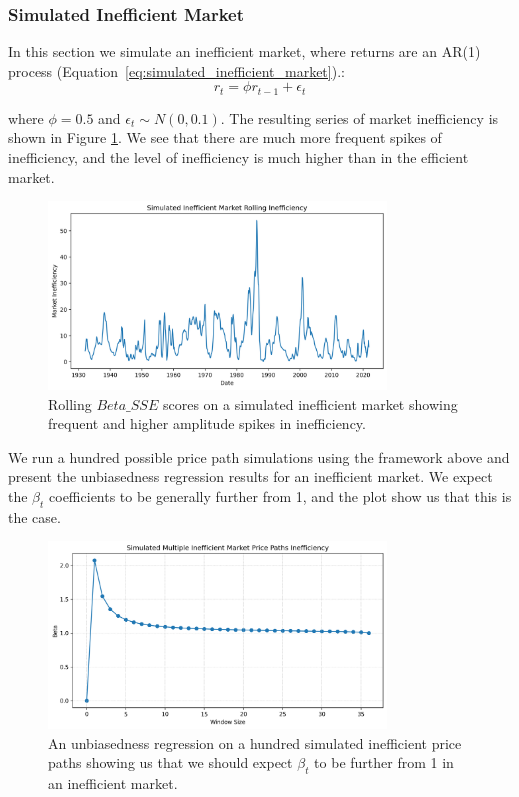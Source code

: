 \subsubsection{Simulated Inefficient Market}
In this section we simulate an inefficient market, where returns are an AR(1) process (Equation~\ref{eq:simulated_inefficient_market}).:
\begin{equation}
    r_t = \phi r_{t-1} + \epsilon_t
    \label{eq:simulated_inefficient_market}
\end{equation}

where $\phi = 0.5$ and $\epsilon_t \sim N(0, 0.1)$. The resulting series of market inefficiency
 is shown in Figure \ref{fig:inefficient_market}. We see that there are much more frequent spikes of inefficiency, and the level of inefficiency is much higher than in the efficient market.

\begin{figure}[h!]
    \centering
    \includegraphics[width=0.8\textwidth]{../figs/Simulated_Inefficient_Market_Rolling_Inefficiency.png}
    \caption{Rolling $Beta\_SSE$ scores on a simulated inefficient market showing frequent and higher amplitude spikes in inefficiency.}
    \label{fig:inefficient_market}
\end{figure}

We run a hundred possible price path simulations using the framework above and present the unbiasedness regression results for an inefficient market.
We expect the $\beta_t$ coefficients to be generally further from 1, and the plot show us that this is the case.

\begin{figure}[h!]
    \centering
    \includegraphics[width=0.8\textwidth]{../figs/Simulated_Multiple_Inefficient_Market_Price_Paths_Inefficiency.png}
    \caption{An unbiasedness regression on a hundred simulated inefficient price paths showing us that we should expect $\beta_t$ to be further from 1 in an inefficient market.}
    \label{fig:inefficient_market_unbiasedness}
\end{figure}

